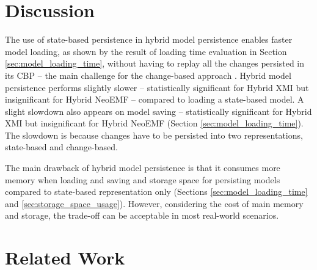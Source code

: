 \vspace{-20pt}
\section{Discussion}
\label{sec:discussion}

\vspace{-10pt}
The use of state-based persistence in hybrid model persistence enables faster model loading, as shown by the result of loading time evaluation in Section \ref{sec:model_loading_time}, without having to replay all the changes persisted in its CBP -- the main challenge for the change-based approach \cite{yohannis2018towards,mens2002state}. 
Hybrid model persistence performs slightly slower -- statistically significant for Hybrid XMI but insignificant for Hybrid NeoEMF -- compared to loading a state-based model. A slight slowdown also appears on model saving -- statistically significant for Hybrid XMI but insignificant for Hybrid NeoEMF (Section \ref{sec:model_loading_time}). The slowdown is because changes have to be persisted into two representations, state-based and change-based. 

The main drawback of hybrid model persistence is that it consumes more memory when loading and saving and storage space for persisting models compared to state-based representation only (Sections \ref{sec:model_loading_time} and \ref{sec:storage_space_usage}). However, considering the cost of main memory and storage, the trade-off can be acceptable in most real-world scenarios.

\vspace{-10pt}
\section{Related Work}
\label{sec:related_work}

